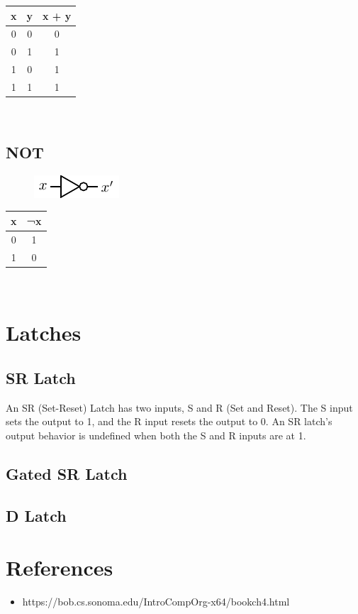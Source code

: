 \begin{tabular}{c c c}
	\hline
	\textbf{x} & \textbf{y} & \textbf{x + y} \\ 
	\hline
	0 & 0 & 0 \\
	0 & 1 & 1 \\
	1 & 0 & 1 \\
	1 & 1 & 1 \\
	\hline 
\end{tabular} \\

\subsection{NOT}

\begin{figure}[h!]
	\includegraphics{./img/not.png}
\end{figure}


\begin{tabular}{c c}
	\hline
	\textbf{x} & \textbf{¬x} \\ 
	\hline
	0 & 1  \\
	1 & 0  \\
	\hline 
\end{tabular} \\

\section{Latches}

\subsection{SR Latch}

An SR (Set-Reset) Latch has two inputs, S and R (Set and Reset). The S input sets the output to 1, and the R input resets the output to 0. An SR latch's output behavior is undefined when both the S and R inputs are at 1.

\subsection{Gated SR Latch}

\subsection{D Latch}

\section{References}

\begin{itemize}
	\item https://bob.cs.sonoma.edu/IntroCompOrg-x64/bookch4.html
\end{itemize}